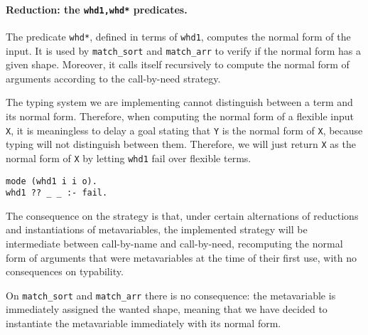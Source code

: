 \documentclass{easychair}
\begin{document}
\paragraph{Reduction: the \texttt{whd1,whd*} predicates.}
The predicate \verb+whd*+, defined in terms of \verb+whd1+, computes the normal form of the input. It is used by \verb+match_sort+ and \verb+match_arr+ to verify if the normal form has a given shape. Moreover, it calls itself recursively to compute the normal form of arguments according to the call-by-need strategy.

The typing system we are implementing cannot distinguish between a term and its normal form. Therefore, when computing the normal form of a flexible input \verb+X+, it is meaningless to delay a goal stating that \verb+Y+ is the normal form of \verb+X+, because typing will not distinguish between them.
Therefore, we will just return \verb+X+ as the normal form of \verb+X+ by letting \verb+whd1+ fail over flexible terms.
\begin{Verbatim}
mode (whd1 i i o).
whd1 ?? _ _ :- fail.
\end{Verbatim}

The consequence on the strategy is that, under certain alternations of reductions and instantiations of metavariables, the implemented strategy will be intermediate between call-by-name and call-by-need, recomputing the normal form of arguments that were metavariables at the time of their first use, with no consequences on typability.

On \verb+match_sort+ and \verb+match_arr+ there is no consequence: the metavariable is immediately assigned the wanted shape, meaning that we have decided to instantiate the metavariable immediately with its normal form.

%
%
%
\end{document}
